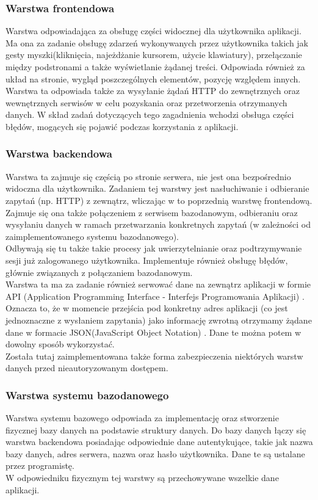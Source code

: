 \documentclass[eng,printmode]{mgr}
\begin{document}
\subsubsection{Warstwa frontendowa}
Warstwa odpowiadająca za obsługę części widocznej dla użytkownika aplikacji. Ma ona za zadanie obsługę zdarzeń wykonywanych przez użytkownika takich jak gesty myszki(kliknięcia, najeżdżanie kursorem, użycie klawiatury), przełączanie między podstronami a także wyświetlanie żądanej treści. Odpowiada również za układ na stronie, wygląd poszczególnych elementów, pozycję względem innych.
\\
Warstwa ta odpowiada także za wysyłanie żądań HTTP do zewnętrznych oraz wewnętrznych serwisów w celu pozyskania oraz przetworzenia otrzymanych danych. W skład zadań dotyczących tego zagadnienia wchodzi obsługa części błędów, mogących się pojawić podczas korzystania z aplikacji.
\subsubsection{Warstwa backendowa}
Warstwa ta zajmuje się częścią po stronie serwera, nie jest ona bezpośrednio widoczna dla użytkownika. Zadaniem tej warstwy jest nasłuchiwanie i odbieranie zapytań (np. HTTP) z zewnątrz, wliczając w to poprzednią warstwę frontendową. Zajmuje się ona także połączeniem z serwisem bazodanowym, odbieraniu oraz wysyłaniu danych w ramach przetwarzania konkretnych zapytań (w zależności od zaimplementowanego systemu bazodanowego).
\\
Odbywają się tu także takie procesy jak uwierzytelnianie oraz podtrzymywanie sesji już zalogowanego użytkownika. Implementuje również obsługę błędów, głównie związanych z połączaniem bazodanowym.
\\
Warstwa ta ma za zadanie również serwować dane na zewnątrz aplikacji w formie API (Application Programming Interface - Interfejs Programowania Aplikacji) \cite{API}. Oznacza to, że w momencie przejścia pod konkretny adres aplikacji (co jest jednoznaczne z wysłaniem zapytania) jako informację zwrotną otrzymamy żądane dane w formacie JSON(JavaScript Object Notation) \cite{JSON}. Dane te można potem w dowolny sposób wykorzystać.
\\
Została tutaj zaimplementowana także forma zabezpieczenia niektórych warstw danych przed nieautoryzowanym dostępem.
\subsubsection{Warstwa systemu bazodanowego}
Warstwa systemu bazowego odpowiada za implementację oraz stworzenie fizycznej bazy danych na podstawie struktury danych. Do bazy danych łączy się warstwa backendowa posiadając odpowiednie dane autentykujące, takie jak nazwa bazy danych, adres serwera, nazwa oraz hasło użytkownika. Dane te są ustalane przez programistę.
\\
W odpowiedniku fizycznym tej warstwy są przechowywane wszelkie dane aplikacji.
\end{document}
